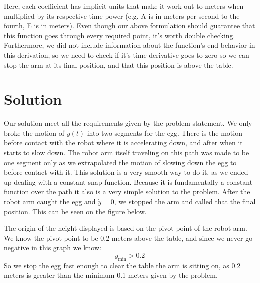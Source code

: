 \documentclass[nofoot,pdf-a,balance,colorlinks,upint,subscriptcorrection,varvw,mathalfa=cal=boondoxo]{asmeconf}
\begin{document}
    Here, each coefficient has implicit units that make it work out to meters when multiplied by its respective time power (e.g. A is in meters per second to the fourth, E is in meters). Even though our above formulation should guarantee that this function goes through every required point, it's worth double checking. Furthermore, we did not include information about the function's end behavior in this derivation, so we need to check if it's time derivative goes to zero so we can stop the arm at its final position, and that this position is above the table.

	 
	\section*{Solution}
	
    Our solution meet all the requirements given by the problem statement. We only broke the motion of $y\left(t\right)$ into two segments for the egg. There is the motion before contact with the robot where it is accelerating down, and after when it starts to slow down. The robot arm itself traveling on this path was made to be one segment only as we extrapolated the motion of slowing down the egg to before contact with it. This solution is a very smooth way to do it, as we ended up dealing with a constant snap function. Because it is fundamentally a constant function over the path it also is a very simple solution to the problem. After the robot arm caught the egg and $\dot{y} = 0$, we stopped the arm and called that the final position. This can be seen on the figure below.\newline


	
	The origin of the height displayed is based on the pivot point of the robot arm. We know the pivot point to be 0.2 meters above the table, and since we never go negative in this graph we know:
	\begin{equation}
	y_{\textrm{min}} > 0.2
	\end{equation}
	So we stop the egg fast enough to clear the table the arm is sitting on, as 0.2 meters is greater than the minimum 0.1 meters given by the problem.
\end{document}
